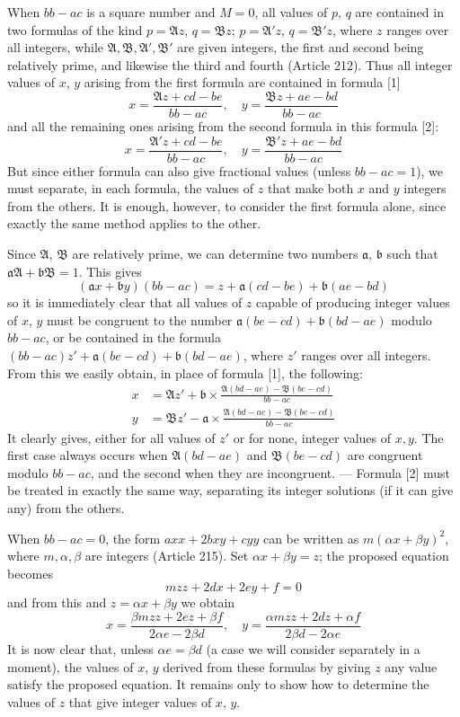 When $bb-ac$ is a square number and $M=0$, all values of $p$, $q$ are contained in two formulas of the kind $p=\mathfrak{A}z$, $q=\mathfrak{B}z$; $p=\mathfrak{A}'z$, $q=\mathfrak{B}'z$, where $z$ ranges over all integers, while $\mathfrak{A},\mathfrak{B},\mathfrak{A}',\mathfrak{B}'$ are given integers, the first and second being relatively prime, and likewise the third and fourth (Article 212). Thus all integer values of $x$, $y$ arising from the first formula are contained in formula [1]
\[
x=\frac{\mathfrak{A}z+cd-be}{bb-ac},\quad
y=\frac{\mathfrak{B}z+ae-bd}{bb-ac}
\]
and all the remaining ones arising from the second formula in this formula [2]:
\[
x=\frac{\mathfrak{A}'z+cd-be}{bb-ac},\quad
y=\frac{\mathfrak{B}'z+ae-bd}{bb-ac}
\]
But since either formula can also give fractional values (unless $bb-ac=1$), we must separate, in each formula, the values of $z$ that make both $x$ and $y$ integers from the others. It is enough, however, to consider the first formula alone, since exactly the same method applies to the other.

Since $\mathfrak{A}$, $\mathfrak{B}$ are relatively prime, we can determine two numbers $\mathfrak{a}$, $\mathfrak{b}$ such that $\mathfrak{a}\mathfrak{A}+\mathfrak{b}\mathfrak{B}=1$. This gives
\[
(\mathfrak{a}x+\mathfrak{b}y)(bb-ac)=z+\mathfrak{a}(cd-be)+\mathfrak{b}(ae-bd)
\]
so it is immediately clear that all values of $z$ capable of producing integer values of $x$, $y$ must be congruent to the number $\mathfrak{a}(be-cd)+\mathfrak{b}(bd-ae)$ modulo $bb-ac$, or be contained in the formula $(bb-ac)z'+\mathfrak{a}(be-cd)+\mathfrak{b}(bd-ae)$, where $z'$ ranges over all integers. From this we easily obtain, in place of formula [1], the following:
\[
\begin{aligned}
x&=\mathfrak{A}z'+\mathfrak{b}\times\frac{\mathfrak{A}(bd-ae)-\mathfrak{B}(be-cd)}{bb-ac}\\
y&=\mathfrak{B}z'-\mathfrak{a}\times\frac{\mathfrak{A}(bd-ae)-\mathfrak{B}(be-cd)}{bb-ac}
\end{aligned}
\]
It clearly gives, either for all values of $z'$ or for none, integer values of $x,y$. The first case always occurs when $\mathfrak{A}(bd-ae)$ and $\mathfrak{B}(be-cd)$ are congruent modulo $bb-ac$, and the second when they are incongruent. --- Formula [2] must be treated in exactly the same way, separating its integer solutions (if it can give any) from the others.

When $bb-ac=0$, the form $axx+2bxy+cyy$ can be written as $m(\alpha x+\beta y)^2$, where $m,\alpha,\beta$ are integers (Article 215). Set $\alpha x+\beta y=z$; the proposed equation becomes
\[
mzz+2dx+2ey+f=0
\]
and from this and $z=\alpha x+\beta y$ we obtain
\[
x=\frac{\beta mzz+2ez+\beta f}{2\alpha e-2\beta d},\quad
y=\frac{\alpha mzz+2dz+\alpha f}{2\beta d-2\alpha e}
\]
It is now clear that, unless $\alpha e=\beta d$ (a case we will consider separately in a moment), the values of $x$, $y$ derived from these formulas by giving $z$ any value satisfy the proposed equation. It remains only to show how to determine the values of $z$ that give integer values of $x$, $y$.

